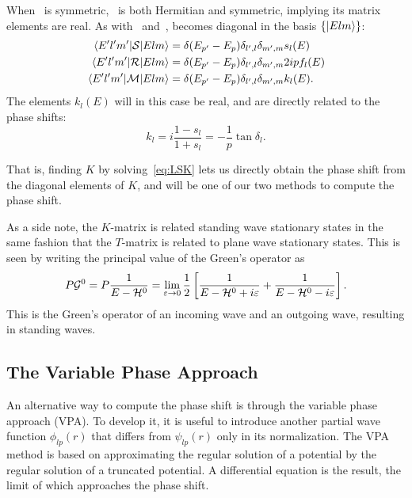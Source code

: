 When\  is symmetric,\  is both Hermitian and
symmetric, implying its matrix elements are real.
As with\  and\ ,  becomes diagonal in the basis
\(\left\{ \ket{Elm} \right\}\):
\begin{align*}
  \mel{E^{\prime}l^{\prime}m^{\prime}}{\mathcal{S}}{Elm} &= \delta(E_{p^{\prime}}-E_{p})\delta_{l^{\prime},l}\delta_{m^{\prime},m}s_{l}(E)\\
  \mel{E^{\prime}l^{\prime}m^{\prime}}{\mathcal{R}}{Elm} &= \delta(E_{p^{\prime}}-E_{p})\delta_{l^{\prime},l}\delta_{m^{\prime},m}2ipf_{l}(E)\\
  \mel{E^{\prime}l^{\prime}m^{\prime}}{\mathcal{M}}{Elm} &= \delta(E_{p^{\prime}}-E_{p})\delta_{l^{\prime},l}\delta_{m^{\prime},m}k_{l}(E).\\
\end{align*}
The elements \(k_{l}(E)\) will in this case be real, and are directly related to
the phase shifts:
\begin{equation}
  \label{eq:tank}
  k_{l} = i \frac{1-s_{l}}{1+s_{l}} = -\frac{1}{p}\tan\delta_{l}.
\end{equation}

That is, finding \(K\) by solving~\eqref{eq:LSK} lets us directly obtain the phase shift from the
diagonal elements of \(K\), and will be one of our two methods to compute the
phase shift.

As a side note, the \(K\)-matrix is related standing wave stationary states in
the same fashion that the \(T\)-matrix is related to plane wave stationary
states. This is seen by writing the principal value of the Green's operator as
\begin{equation*}
  P\mathcal{G}^{0} = P \frac{1}{E-\mathcal{H}^{0}} = \lim_{\varepsilon\to 0}\frac{1}{2}
  \left[ \frac{1}{E-\mathcal{H}^{0}+i\varepsilon} + \frac{1}{E-\mathcal{H}^{0}-i\varepsilon} \right].
\end{equation*}
This is the Green's operator of an incoming wave and an outgoing wave, resulting in
standing waves.

\subsection{The Variable Phase Approach}
An alternative way to compute the phase shift is through the variable phase
approach (VPA).
To develop it, it is useful to introduce another partial wave function
\(\phi_{lp}(r)\) that differs from \(\psi_{lp}(r)\) only in its normalization. 
The VPA method is based on approximating the regular solution of a potential by
the regular solution of a truncated potential. A differential equation is the
result, the limit of which approaches the phase shift.

